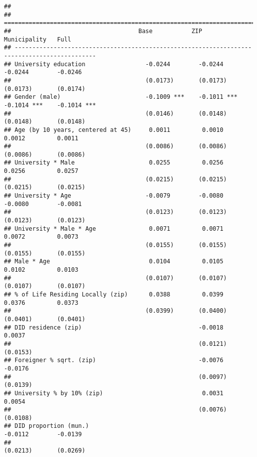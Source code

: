 \documentclass[
]{article}
\begin{document}
\begin{verbatim}
## 
## =============================================================================================
##                                    Base           ZIP            Municipality   Full         
## ---------------------------------------------------------------------------------------------
## University education                 -0.0244        -0.0244        -0.0244        -0.0246    
##                                      (0.0173)       (0.0173)       (0.0173)       (0.0174)   
## Gender (male)                        -0.1009 ***    -0.1011 ***    -0.1014 ***    -0.1014 ***
##                                      (0.0146)       (0.0148)       (0.0148)       (0.0148)   
## Age (by 10 years, centered at 45)     0.0011         0.0010         0.0012         0.0011    
##                                      (0.0086)       (0.0086)       (0.0086)       (0.0086)   
## University * Male                     0.0255         0.0256         0.0256         0.0257    
##                                      (0.0215)       (0.0215)       (0.0215)       (0.0215)   
## University * Age                     -0.0079        -0.0080        -0.0080        -0.0081    
##                                      (0.0123)       (0.0123)       (0.0123)       (0.0123)   
## University * Male * Age               0.0071         0.0071         0.0072         0.0073    
##                                      (0.0155)       (0.0155)       (0.0155)       (0.0155)   
## Male * Age                            0.0104         0.0105         0.0102         0.0103    
##                                      (0.0107)       (0.0107)       (0.0107)       (0.0107)   
## % of Life Residing Locally (zip)      0.0388         0.0399         0.0376         0.0373    
##                                      (0.0399)       (0.0400)       (0.0401)       (0.0401)   
## DID residence (zip)                                 -0.0018                        0.0037    
##                                                     (0.0121)                      (0.0153)   
## Foreigner % sqrt. (zip)                             -0.0076                       -0.0176    
##                                                     (0.0097)                      (0.0139)   
## University % by 10% (zip)                            0.0031                        0.0054    
##                                                     (0.0076)                      (0.0108)   
## DID proportion (mun.)                                              -0.0112        -0.0139    
##                                                                    (0.0213)       (0.0269)   

\end{verbatim}
\end{document}
